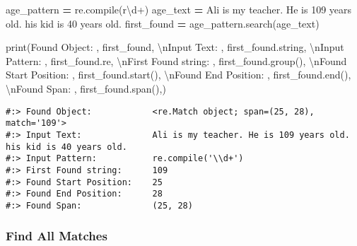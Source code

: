 \documentclass[
]{book}
\newenvironment{Shaded}{\begin{snugshade}}{\end{snugshade}}
\newcommand{\BuiltInTok}[1]{#1}
\newcommand{\CharTok}[1]{\textcolor[rgb]{0.5,0.5,0.5}{#1}}
\newcommand{\NormalTok}[1]{#1}
\newcommand{\OperatorTok}[1]{\textcolor[rgb]{0.43,0.43,0.43}{\textbf{#1}}}
\newcommand{\StringTok}[1]{\textcolor[rgb]{0.5,0.5,0.5}{#1}}
\newcommand{\VerbatimStringTok}[1]{\textcolor[rgb]{0.5,0.5,0.5}{#1}}
\begin{document}
\begin{Shaded}
\begin{Highlighting}[]
\NormalTok{age\_pattern }\OperatorTok{=}\NormalTok{ re.}\BuiltInTok{compile}\NormalTok{(}\VerbatimStringTok{r\textquotesingle{}\textbackslash{}d+\textquotesingle{}}\NormalTok{)}
\NormalTok{age\_text    }\OperatorTok{=} \StringTok{\textquotesingle{}Ali is my teacher. He is 109 years old. his kid is 40 years old.\textquotesingle{}}
\NormalTok{first\_found }\OperatorTok{=}\NormalTok{ age\_pattern.search(age\_text)}

\BuiltInTok{print}\NormalTok{(}\StringTok{\textquotesingle{}Found Object:           \textquotesingle{}}\NormalTok{, first\_found,}
      \StringTok{\textquotesingle{}}\CharTok{\textbackslash{}n}\StringTok{Input Text:             \textquotesingle{}}\NormalTok{, first\_found.string,}
      \StringTok{\textquotesingle{}}\CharTok{\textbackslash{}n}\StringTok{Input Pattern:          \textquotesingle{}}\NormalTok{, first\_found.re,}
      \StringTok{\textquotesingle{}}\CharTok{\textbackslash{}n}\StringTok{First Found string:     \textquotesingle{}}\NormalTok{, first\_found.group(),}
      \StringTok{\textquotesingle{}}\CharTok{\textbackslash{}n}\StringTok{Found Start Position:   \textquotesingle{}}\NormalTok{, first\_found.start(),}
      \StringTok{\textquotesingle{}}\CharTok{\textbackslash{}n}\StringTok{Found End Position:     \textquotesingle{}}\NormalTok{, first\_found.end(),}
      \StringTok{\textquotesingle{}}\CharTok{\textbackslash{}n}\StringTok{Found Span:             \textquotesingle{}}\NormalTok{, first\_found.span(),)}
\end{Highlighting}
\end{Shaded}

\begin{verbatim}
#:> Found Object:            <re.Match object; span=(25, 28), match='109'> 
#:> Input Text:              Ali is my teacher. He is 109 years old. his kid is 40 years old. 
#:> Input Pattern:           re.compile('\\d+') 
#:> First Found string:      109 
#:> Found Start Position:    25 
#:> Found End Position:      28 
#:> Found Span:              (25, 28)
\end{verbatim}

\hypertarget{find-all-matches}{%
\subsubsection{Find All Matches}\label{find-all-matches}}
\end{document}
